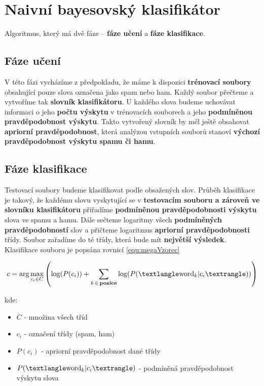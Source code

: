 \documentclass[12pt]{report}
\newcommand\la{\textlangle}  					%
\newcommand\ra{\textrangle}						%
\begin{document}
	\section{Naivní bayesovský klasifikátor}
	Algoritmus, který má dvě fáze – \textbf{fáze učení} a \textbf{fáze klasifikace}.
	
		\subsection{Fáze učení}
		V této fázi vycházíme z předpokladu, že máme k dispozici \textbf{trénovací soubory} obsahující pouze slova označena jako spam nebo ham. Každý soubor přečteme a vytvoříme tak \textbf{slovník klasifikátoru}. U každého slova budeme uchovávat informaci o jeho \textbf{počtu výskytu} v trénovacích souborech a jeho \textbf{podmíněnou pravděpodobnost výskytu}. Takto vytvořený slovník by měl ještě obsahovat \textbf{apriorní pravděpodobnost}, která analýzou vstupních souborů stanoví \textbf{výchozí pravděpodobnost výskytu spamu či hamu}.
	
		\subsection{Fáze klasifikace}
		Testovací soubory budeme klasifikovat podle obsažených slov. Průběh klasifikace je takový, že každému slovu vyskytující se v \textbf{testovacím souboru a zároveň ve slovníku klasifikátoru} přiřadíme \textbf{podmíněnou pravděpodobnosti výskytu} slova ve spamu a hamu. Dále sečteme logaritmy všech \textbf{podmíněných pravděpodobností} slov a přičteme logaritmus \textbf{apriorní pravděpodobnosti} třídy. Soubor zařadíme do té třídy, která bude mít \textbf{největší výsledek}. Klasifikace souboru je popsána rovnicí \ref{equ:megaVzorec}
		
		\begin{equation}
			c = \arg\max_{c_i \in C}\left( \log (P(c_i)) + \sum_{k\,\in\,\text{\bfseries pozice}} \log (P(\la \text{word}_k | c_i \ra))\right)
			\label{equ:megaVzorec}
		\end{equation}
	
		kde:
		\begin{itemize}
			\item $C$ - množina všech tříd
			\item $c_i$ - označení třídy (spam, ham)
			\item $P(c_i)$ - apriorní pravděpodobnost dané třídy
			\item $P(\la \text{word}_k | c_i \ra)$ - podmíněná pravděpodobnost výskytu slova 
		\end{itemize}
			
\end{document}
